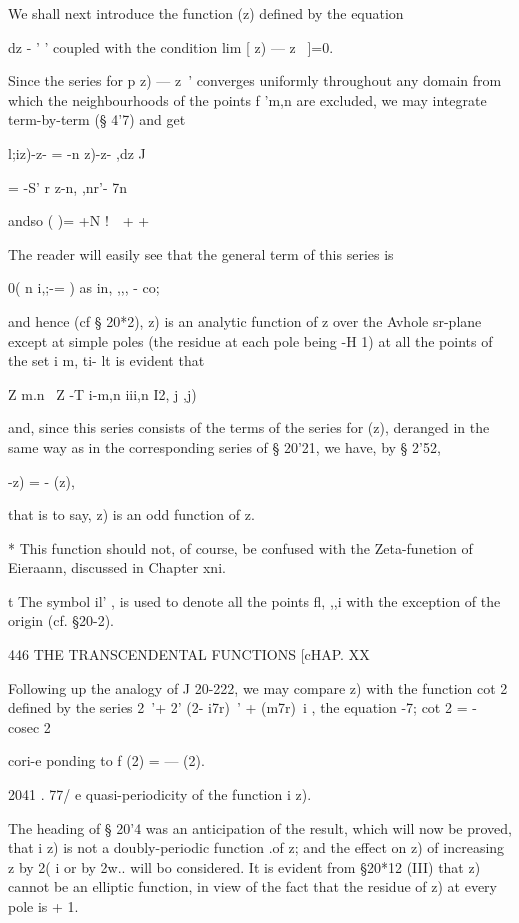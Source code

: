 {We shall next introduce the function (z) defined by the equation

dz - ' ' coupled with the condition lim [ z) — z~ ]=0.

Since the series for p z) — z~' converges uniformly throughout any
domain from which the neighbourhoods of the points f 'm,n are
excluded, we may integrate term-by-term (§ 4'7) and get

l;iz)-z- = -n z)-z- ,dz J

= -S' r z-n, ,nr'- 7n%

andso ( )= +N !\ \ + +

The reader will easily see that the general term of this series is

0( n i,;-= ) as in, ,,, - co;

and hence (cf § 20*2), z) is an analytic function of z over the Avhole
sr-plane except at simple poles (the residue at each pole being -H 1)
at all the points of the set i m, ti- lt is evident that

Z m.n \ Z -T i-m,n iii,n I2, j ,j)

and, since this series consists of the terms of the series for (z),
deranged in the same way as in the corresponding series of § 20'21, we
have, by § 2'52,

  -z) = - (z),

that is to say, z) is an odd function of z.

* This function should not, of course, be confused with the
Zeta-funetion of Eieraann, discussed in Chapter xni.

t The symbol il' , is used to denote all the points fl, ,,i with the
exception of the origin (cf. §20-2).

446 THE TRANSCENDENTAL FUNCTIONS [cHAP. XX

Following up the analogy of J 20-222, we may compare z) with the
function cot 2 defined by the series 2~'+ 2' (2- i7r)~' + (m7r)~i ,
the equation -7; cot 2 = - cosec 2

cori-e ponding to f (2) = — (2).

2041 . 77/ e quasi-periodicity of the function i z).

The heading of § 20'4 was an anticipation of the result, which will
now be proved, that i z) is not a doubly-periodic function .of z; and
the effect on z) of increasing z by 2( i or by 2w.. will bo
considered. It is evident from §20*12 (III) that z) cannot be an
elliptic function, in view of the fact that the residue of z) at every
pole is + 1.

}
